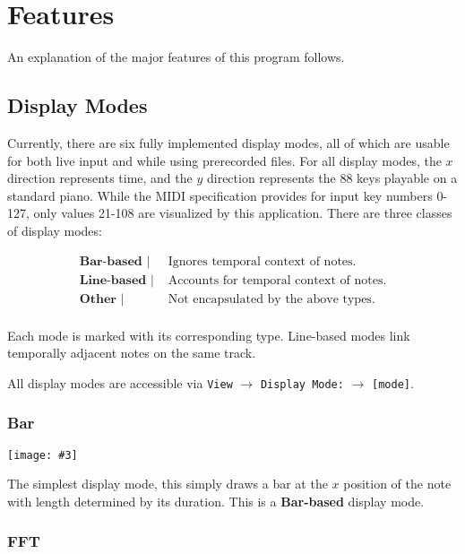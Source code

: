 \documentclass[english]{article}
\makeatletter
\newenvironment{restoretext}%
    {\@parboxrestore%
     \begin{adjustwidth}{}{\leftmargin}%
    }{\end{adjustwidth}
     }
\def\rcbegin{\begin{restoretext}\centering}
\def\rcend{\end{restoretext}}
\newcommand{\rcgnc}[3][]{
  \rcbegin
    \texttt{[image: \#3]}
  \rcend
  \vspace{1em}
}
\providecommand{\mi}[1]{\texttt{#1}}
\makeatother
\begin{document}
\section{Features}

An explanation of the major features of this program follows.

\subsection{Display Modes}

Currently, there are six fully implemented display modes, all of which are usable for both live input and
while using prerecorded files. For all display modes, the $x$ direction represents time, and the $y$ direction
represents the 88 keys playable on a standard piano. While the MIDI specification provides for input key numbers
0-127, only values 21-108 are visualized by this application. There are three classes of display modes:

\rcbegin
\begin{align*}
  \textbf{Bar-based }  | & \text{ Ignores temporal context of notes.}\\
  \textbf{Line-based } | & \text{ Accounts for temporal context of notes.}\\
  \textbf{Other }      | & \text{ Not encapsulated by the above types.}\\
\end{align*}
\rcend

Each mode is marked with its corresponding type. Line-based modes link temporally adjacent notes on the same track.

All display modes are accessible via 
\mi{View} $\rightarrow$ \mi{Display Mode:} $\rightarrow$ \mi{[mode]}.

\newpage

\subsubsection{Bar}

\rcgnc{0.86}{image/bar.png}

The simplest display mode, this simply draws a bar at the $x$ position of the note with length
determined by its duration.
This is a \textbf{Bar-based} display mode.

\subsubsection{FFT}
\end{document}
